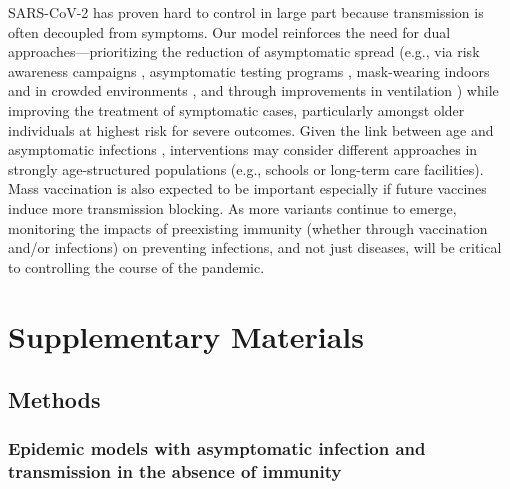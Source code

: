 \documentclass[12pt]{article}
\begin{document}
SARS-CoV-2 has proven hard to control in large part because transmission is often decoupled from symptoms. 
Our model reinforces the need for dual approaches---prioritizing the reduction of asymptomatic spread (e.g., via risk awareness campaigns \citep{chande2020real,sinclair2021pairing}, asymptomatic testing programs \citep{mina2021covid,gibson2022surv}, mask-wearing indoors and in crowded environments \citep{jones2020two,prather2020reducing,howard2021ev}, and through improvements in ventilation \citep{allen2021indoor,wang2021airborne}) while improving the treatment of symptomatic cases, particularly amongst older individuals at highest risk for severe outcomes.
Given the link between age and asymptomatic infections \citep{davies2020}, interventions may consider different approaches in strongly age-structured populations (e.g., schools or long-term care facilities).
Mass vaccination is also expected to be important especially if future vaccines induce more transmission blocking.
As more variants continue to emerge, monitoring the impacts of preexisting immunity (whether through vaccination and/or infections) on preventing infections, and not just diseases, will be critical to controlling the course of the pandemic.

\pagebreak

\section*{Supplementary Materials}
\setcounter{figure}{0}
\renewcommand{\thefigure}{S\arabic{figure}}

\subsection*{Methods}

\subsubsection*{Epidemic models with asymptomatic infection and transmission in the absence of immunity}
\end{document}
